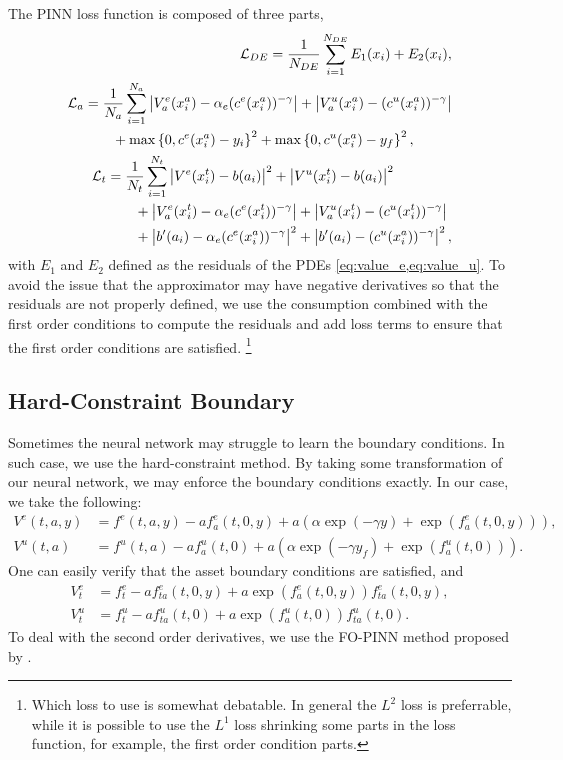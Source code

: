 \documentclass[a4paper, 12pt]{article}
\begin{document}
The PINN loss function is composed of three parts, 
\begin{align}
    \begin{split}
        \mathcal{L}_{DE} = \frac{1}{N_{DE}}\sum_{i=1}^{N_{DE}} E_1(x_i) + E_2(x_i), 
    \end{split}\\
    \begin{split}
        \mathcal{L}_{a} &= \frac{1}{N_a}\sum_{i=1}^{N_a} \left\lvert {V^e_a(x^{a}_i) - \alpha_e (c^e(x^{a}_i))^{-\gamma}} \right\rvert + \left\lvert {V^u_a(x^{a}_i) - (c^u(x^{a}_i))^{-\gamma}} \right\rvert \\
        &\qquad + \max\left\{ {0, c^e(x^{a}_i) - y_i} \right\}^2 + \max\left\{ {0, c^u(x^{a}_i) - y_f} \right\}^2, \\
    \end{split}\\
    \begin{split}
        \mathcal{L}_{t} &= \frac{1}{N_t}\sum_{i=1}^{N_t} \left\lvert {V^e(x^t_i) - b(a_i)} \right\rvert^2 + \left\lvert {V^u(x^t_i) - b(a_i)} \right\rvert^2 \\
        &\qquad + \left\lvert {V^e_a(x^t_i) - \alpha_e (c^e(x^t_i))^{-\gamma}} \right\rvert + \left\lvert {V^u_a(x^{t}_i) - (c^u(x^{t}_i))^{-\gamma}} \right\rvert \\
        &\qquad + \left\lvert {b'(a_i) - \alpha_e (c^e(x^{a}_i))^{-\gamma}} \right\rvert^2 + \left\lvert {b'(a_i) - (c^u(x^{a}_i))^{-\gamma}} \right\rvert^2,  
    \end{split}
\end{align}
with $E_1$ and $E_2$ defined as the residuals of the PDEs \cref{eq:value_e,eq:value_u}. To avoid the issue 
that the approximator may have negative derivatives so that the residuals are not properly 
defined, we use the consumption combined with the first order conditions to compute the 
residuals and add loss terms to ensure that the first order conditions are satisfied.
\footnote{Which loss to use is somewhat debatable. In general the $L^2$ loss is preferrable, 
while it is possible to use the $L^1$ loss shrinking some parts in the loss function, for 
example, the first order condition parts.} 

\subsection{Hard-Constraint Boundary}
Sometimes the neural network may struggle to learn the boundary conditions. In such
case, we use the hard-constraint method. By taking some transformation of our neural
network, we may enforce the boundary conditions exactly. In our case, we take the 
following: 
\begin{align}
    V^e(t,a,y) &= f^e(t,a,y) - af^e_a(t,0,y) + a(\alpha\exp(-\gamma y) + \exp(f^e_a(t,0,y))), \\
    V^u(t,a) &= f^u(t,a) - af^u_a(t,0) + a(\alpha\exp(-\gamma y_f) + \exp(f^u_a(t,0))).
\end{align}
One can easily verify that the asset boundary conditions are satisfied, and 
\begin{align}
    V^e_t &= f^e_t - af^e_{ta}(t,0,y) + a\exp(f^e_a(t,0,y))f^e_{ta}(t,0,y), \\
    V^u_t &= f^u_t - af^u_{ta}(t,0) + a\exp(f^u_a(t,0))f^u_{ta}(t,0).
\end{align}
To deal with the second order derivatives, we use the FO-PINN method proposed by 
\cite{gladstone2023}. 
\end{document}
